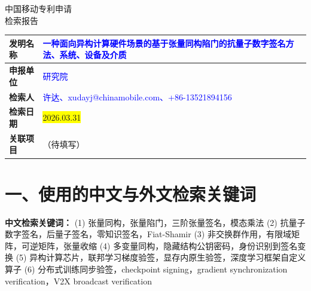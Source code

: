 \documentclass[12pt,a4paper]{article}
\newcommand{\heiti}{\CJKfamily{hei}}
\begin{document}
\noindent

\vspace{1em}

\begin{center}
    {\Huge\heiti 中国移动专利申请} \\[0.5em]
    {\Huge\heiti 检索报告} \\[1em]
\end{center}

\begin{table}[h]
    \centering
    \renewcommand{\arraystretch}{2}
    \begin{tabular}{|p{3cm}|p{12cm}|}
        \hline
        \textbf{发明名称} & \textcolor{blue}{一种面向异构计算硬件场景的基于张量同构陷门的抗量子数字签名方法、系统、设备及介质} \\
        \hline
        \textbf{申报单位} & \textcolor{blue}{研究院} \\
        \hline
        \textbf{检索人} & \textcolor{blue}{许达、xudayj@chinamobile.com、+86-13521894156} \\
        \hline
        \textbf{检索日期} & \colorbox{yellow}{2026.03.31} \\
        \hline
        \textbf{关联项目} & （待填写） \\
        \hline
    \end{tabular}
\end{table}

\vspace{0.5em}

\noindent{}

\vspace{1em}

\section*{一、使用的中文与外文检索关键词}

\textbf{中文检索关键词：}
(1) 张量同构，张量陷门，三阶张量签名，模态乘法
(2) 抗量子数字签名，后量子签名，零知识签名，Fiat-Shamir
(3) 非交换群作用，有限域矩阵，可逆矩阵，张量收缩
(4) 多变量同构，隐藏结构公钥密码，身份识别到签名变换
(5) 异构计算芯片，联邦学习梯度验签，显存内原生验签，深度学习框架自定义算子
(6) 分布式训练同步验签，checkpoint signing，gradient synchronization verification，V2X broadcast verification
\end{document}

